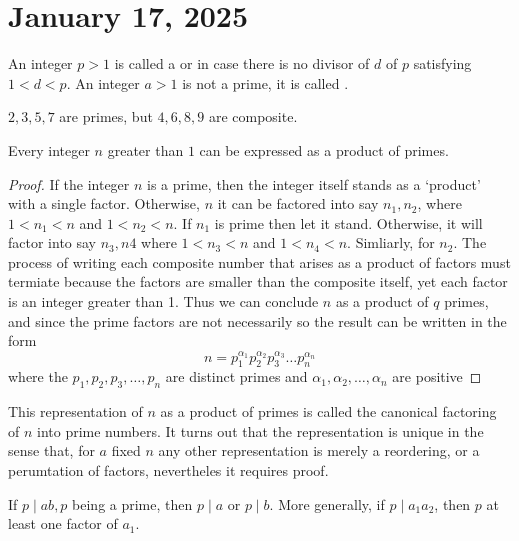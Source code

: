 \documentclass[11pt]{article}
\begin{document}
\section{January 17, 2025}
\begin{definition}
    An integer \(p > 1\) is called a  or  in case there is no divisor of \(d\) of \(p\) satisfying \(1 < d < p\). An integer \(a > 1\) is not a prime, it is called .
\end{definition}
\begin{example}
    \(2, 3, 5, 7\) are primes, but \(4, 6, 8, 9\) are composite.
\end{example}
\begin{theorem}\label{1.14}
    Every integer \(n\) greater than \(1\) can be expressed as a product of primes.
\end{theorem}

\begin{proof}
    If the integer \(n\) is a prime, then the integer itself stands as a `product' with a single factor. Otherwise, \(n\) it can be factored into say \(n_1, n_2\), where \(1 < n_1 < n\) and \( 1 < n_2 < n\). If \(n_1\) is prime then let it stand. Otherwise, it will factor into say \(n_3, n4\) where \(1 < n_3 < n\) and \(1 < n_4 < n\). Simliarly, for \(n_2\). The process of writing each composite number that arises as a product of factors must termiate because the factors are smaller than the composite itself, yet each factor is an integer greater than 1. Thus we can conclude \(n\) as a product of \(q\) primes, and since the prime factors are not necessarily so the result can be written in the form
    \[ n = p_1^{\alpha_1}p_2^{\alpha_2}p_3^{\alpha_3}\ldots p_n^{\alpha_n}\]
    where the \(p_1, p_2, p_3, \ldots, p_n\) are distinct primes and \(\alpha_1,
    \alpha_2, \ldots, \alpha_n\) are positive
\end{proof}
\begin{fact}
    This representation of \(n\) as a product of primes is called the canonical
    factoring of \(n\) into prime numbers. It turns out that the representation is
    unique in the sense that, for \(a\) fixed \(n\) any other representation is
    merely a reordering, or a perumtation of factors, nevertheles it requires
    proof.
\end{fact}

\begin{theorem}\label{1.15}
    If \(p \mid ab, p\) being a prime, then \(p \mid a\) or \(p \mid b\). More generally, if \(p \mid a_1 a_2\), then \(p\) at least one factor of \(a_1\).
\end{theorem}
\end{document}
